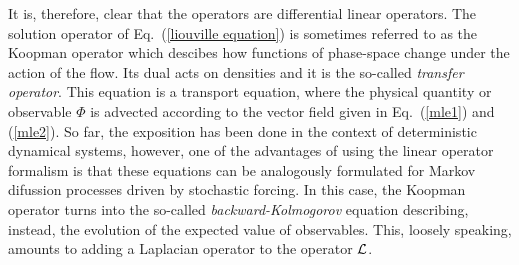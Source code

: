 \documentclass[12pt]{article}
\begin{document}
It is, therefore, clear that the operators are differential linear operators. The solution operator of Eq.~(\ref{liouville equation}) is sometimes referred to as the Koopman operator which descibes how functions of phase-space change under the action of the flow. Its dual acts on densities and it is the so-called \emph{transfer operator}. This equation is a transport equation, where the physical quantity or observable $\Phi$ is advected according to the vector field given in Eq.~(\ref{mle1}) and (\ref{mle2}). So far, the exposition has been done in the context of deterministic dynamical systems, however, one of the advantages of using the linear operator formalism is that these equations can be analogously formulated for Markov difussion processes driven by stochastic forcing. In this case, the Koopman operator turns into the so-called \emph{backward-Kolmogorov} equation describing, instead, the evolution of the expected value of observables. This, loosely speaking, amounts to adding a Laplacian operator to the operator $\mathcal{L}$. 
\end{document}
